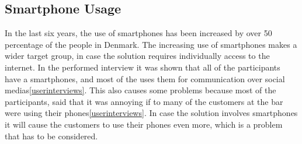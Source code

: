 \subsection{Smartphone Usage}
\label{sub:smartphone_usage}

In the last six years, the use of smartphones has been increased by over 50 percentage of the people in Denmark\cite{danmarksStatestkSmartphone}. The increasing use of smartphones makes a wider target group, in case the solution requires individually access to the internet. In the performed interview it was shown that all of the participants have a smartphones, and most of the uses them for communication over social medias\cref{userinterviews}. This also causes some problems because most of the participants, said that it was annoying if to many of the customers at the bar were using their phones\cref{userinterviews}. In case the solution involves smartphones it will cause the customers to use their phones even more, which is a problem that has to be considered. 
